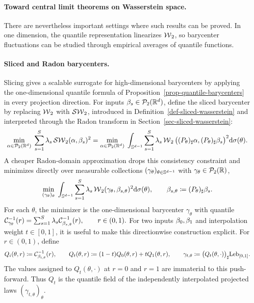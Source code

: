 \paragraph{Toward central limit theorems on Wasserstein space.}
There are nevertheless important settings where such results can be proved. In one dimension, the quantile representation linearizes $\operatorname{\mathcal{W}}_2$, so barycenter fluctuations can be studied through empirical averages of quantile functions.

\paragraph{Sliced and Radon barycenters.}
Slicing gives a scalable surrogate for high-dimensional barycenters by applying the one-dimensional quantile formula of Proposition~\ref{prop-quantile-barycenters} in every projection direction. For inputs $\beta_s\in\mathcal{P}_2(\mathbb{R}^d)$, define the sliced barycenter by replacing $\operatorname{\mathcal{W}}_2$ with $\operatorname{\mathcal{SW}}_2$, introduced in Definition~\ref{def-sliced-wasserstein} and interpreted through the Radon transform in Section~\ref{sec-sliced-wasserstein}:
\[
\underset{\alpha\in\mathcal{P}_2(\mathbb{R}^d)}{\min}\;
\sum_{s=1}^S\lambda_s\operatorname{\mathcal{SW}}_2(\alpha,\beta_s)^2
=
\underset{\alpha\in\mathcal{P}_2(\mathbb{R}^d)}{\min}\;
\int_{\mathbb{S}^{d-1}}
\sum_{s=1}^S\lambda_s
\operatorname{\mathcal{W}}_2\big((P_\theta)_\sharp\alpha,(P_\theta)_\sharp\beta_s\big)^2
\mathrm{d}\sigma(\theta).
\]
A cheaper Radon-domain approximation drops this consistency constraint and minimizes directly over measurable collections $(\gamma_\theta)_{\theta\in\mathbb{S}^{d-1}}$ with $\gamma_\theta\in\mathcal{P}_2(\mathbb{R})$,
\[
\underset{(\gamma_\theta)_\theta}{\min}\;
\int_{\mathbb{S}^{d-1}}
\sum_{s=1}^S\lambda_s
\operatorname{\mathcal{W}}_2(\gamma_\theta,\beta_{s,\theta})^2
\mathrm{d}\sigma(\theta),
\qquad
\beta_{s,\theta}\coloneqq(P_\theta)_\sharp\beta_s.
\]
For each $\theta$, the minimizer is the one-dimensional barycenter $\gamma_\theta$ with quantile
\(\mathcal{C}_{\gamma_\theta}^{-1}(r) = \sum_{s=1}^S\lambda_s\mathcal{C}_{\beta_{s,\theta}}^{-1}(r), \qquad r\in(0,1).\)
For two inputs $\beta_0,\beta_1$ and interpolation weight $t\in[0,1]$, it is useful to make this directionwise construction explicit. For $r\in(0,1)$, define
\begin{equation}\label{eq-radon-barycenter-quantile-field}
Q_i(\theta,r)
\coloneqq
\mathcal{C}_{\beta_{i,\theta}}^{-1}(r),
\qquad
Q_t(\theta,r)
\coloneqq
(1-t)Q_0(\theta,r)+tQ_1(\theta,r),
\qquad
\gamma_{t,\theta}
\coloneqq
\bigl(Q_t(\theta,\cdot)\bigr)_\sharp\mathrm{Leb}_{[0,1]}.
\end{equation}
The values assigned to $Q_t(\theta,\cdot)$ at $r=0$ and $r=1$ are immaterial to this push-forward. Thus $Q_t$ is the quantile field of the independently interpolated projected laws $(\gamma_{t,\theta})_\theta$.

